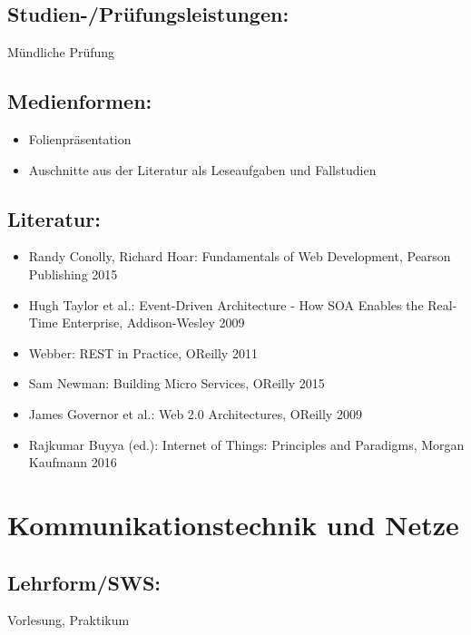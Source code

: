 \section{Studien-/Prüfungsleistungen:}\label{studien-pruxfcfungsleistungen-11}

Mündliche Prüfung

\section{Medienformen:}\label{medienformen-11}

\begin{itemize}
\tightlist
\item
  Folienpräsentation
\item
  Auschnitte aus der Literatur als Leseaufgaben und Fallstudien
\end{itemize}

\section{Literatur:}\label{literatur-11}

\begin{itemize}
\tightlist
\item
  Randy Conolly, Richard Hoar: Fundamentals of Web Development, Pearson
  Publishing 2015
\item
  Hugh Taylor et al.: Event-Driven Architecture - How SOA Enables the
  Real-Time Enterprise, Addison-Wesley 2009
\item
  Webber: REST in Practice, OReilly 2011
\item
  Sam Newman: Building Micro Services, OReilly 2015
\item
  James Governor et al.: Web 2.0 Architectures, OReilly 2009
\item
  Rajkumar Buyya (ed.): Internet of Things: Principles and Paradigms,
  Morgan Kaufmann 2016
\end{itemize}

\chapter{Kommunikationstechnik und
Netze}\label{kommunikationstechnik-und-netze}

\section{Lehrform/SWS:}\label{lehrformsws-12}

Vorlesung, Praktikum


